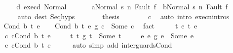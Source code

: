 \begin{isabellebody}
\ \ \ \ \isamarkupfalse%
\ \isamarkupfalse%
\ d{}\ exec{\isacharunderscore}d{}\ Normal\ \isanewline
\ \ \ \ \isamarkupfalse%
\ {\isachardoublequoteopen}{\isasymGamma}{\isasymturnstile}{\isasymlangle}a{}{\isacharcomma}Normal\ s{\isacharprime}{\isacharprime}{\isasymrangle}\ {\isacharequal}n{\isasymRightarrow}\ Fault\ f\ {\isasymor}\ {\isasymGamma}{\isasymturnstile}{\isasymlangle}b{}{\isacharcomma}Normal\ s{\isacharprime}{\isacharprime}{\isasymrangle}\ {\isacharequal}n{\isasymRightarrow}\ Fault\ f{\isachardoublequoteclose}\ \isanewline
\ \ \ \ \ \ \isamarkupfalse%
\ {\isacharparenleft}auto\ dest{\isacharcolon}\ Seq{\isachardot}hyps{\isacharparenright}\isanewline
\ \ \ \ \isamarkupfalse%
\ \isamarkupfalse%
\ {\isacharquery}thesis\isanewline
\ \ \ \ \ \ \isamarkupfalse%
\ c{}\ \isamarkupfalse%
\ {\isacharparenleft}auto\ intro{\isacharcolon}\ execn{\isachardot}intros{\isacharparenright}\isanewline
\ \ \isamarkupfalse%
\isanewline
{}\isamarkupfalse%
\isanewline
\ \ \isamarkupfalse%
\ {\isacharparenleft}Cond\ b\ t{}\ e{}{\isacharparenright}\isanewline
\ \ \isamarkupfalse%
\ {\isachardoublequoteopen}{\isacharparenleft}Cond\ b\ t{}\ e{}\ {\isasyminter}\isactrlsub g\ c{}{\isacharparenright}\ {\isacharequal}\ Some\ c{\isachardoublequoteclose}\ \isamarkupfalse%
\ fact\isanewline
\ \ \isamarkupfalse%
\ \isamarkupfalse%
\ t{}\ e{}\ t\ e\ \isanewline
\ \ \ \ c{}{\isacharcolon}\ {\isachardoublequoteopen}c{}{\isacharequal}Cond\ b\ t{}\ e{}{\isachardoublequoteclose}\ \isanewline
\ \ \ \ t{\isacharcolon}\ {\isachardoublequoteopen}{\isacharparenleft}t{}\ {\isasyminter}\isactrlsub g\ t{}{\isacharparenright}\ {\isacharequal}\ Some\ t{\isachardoublequoteclose}\ \isanewline
\ \ \ \ e{\isacharcolon}\ {\isachardoublequoteopen}{\isacharparenleft}e{}\ {\isasyminter}\isactrlsub g\ e{}{\isacharparenright}\ {\isacharequal}\ Some\ e{\isachardoublequoteclose}\ \isanewline
\ \ \ \ c{\isacharcolon}\ {\isachardoublequoteopen}c{\isacharequal}Cond\ b\ t\ e{\isachardoublequoteclose}\isanewline
\ \ \ \ \isamarkupfalse%
\ {\isacharparenleft}auto\ simp\ add{\isacharcolon}\ inter{\isacharunderscore}guards{\isacharunderscore}Cond{\isacharparenright}\isanewline

\end{isabellebody}
